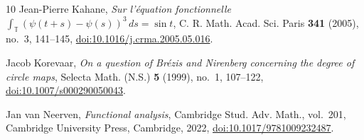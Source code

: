 \documentclass[11pt]{amsart}
\theoremstyle{definition}
\theoremstyle{remark}
\begin{document}
\begin{thebibliography}{10}
Jean-Pierre Kahane, \emph{Sur l'\'{e}quation fonctionnelle
$\int_{\mathbb T}(\psi(t+s)-\psi(s))^3\,ds=\sin t$}, C. R. Math. Acad.
Sci. Paris \textbf{341} (2005), no.~3, 141--145,
\href{https://doi.org/10.1016/j.crma.2005.05.016}{doi:10.1016/j.crma.2005.05.016}.

Jacob Korevaar, \emph{On a question of Br\'{e}zis and Nirenberg concerning the
degree of circle maps}, Selecta Math. (N.S.) \textbf{5} (1999), no.~1,
107--122,
\href{https://doi.org/10.1007/s000290050043}{doi:10.1007/s000290050043}.

Jan van Neerven, \emph{Functional analysis},
Cambridge Stud. Adv. Math., vol.~201, Cambridge University Press, Cambridge,
2022,
\href{https://doi.org/10.1017/9781009232487}{doi:10.1017/9781009232487}.

\end{thebibliography}
\end{document}
